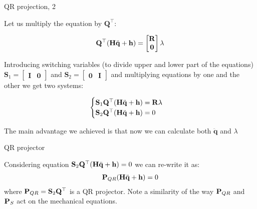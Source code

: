 \documentclass{beamer}
\begin{document}
\begin{frame}{QR projection, 2}
	\begin{flushleft}
		
		Let us multiply the equation by $\mathbf{Q}^\top$:
		
		\begin{equation}
			\mathbf{Q}^\top (\mathbf{H}\ddot{\mathbf{q}} + \mathbf{h}) = \begin{bmatrix} \mathbf{R} \\ \mathbf{0}  \end{bmatrix} \lambda
		\end{equation}
		
		Introducing switching variables (to divide upper and lower part of the equations) $\mathbf{S}_1 = \begin{bmatrix} \mathbf{I} & \mathbf{0}  \end{bmatrix}$ and $\mathbf{S}_2 = \begin{bmatrix} \mathbf{0} & \mathbf{I}  \end{bmatrix}$ and multiplying equations by one and the other we get two systems:
		
		\begin{equation}
			\begin{cases}
				\mathbf{S}_1 \mathbf{Q}^\top (\mathbf{H}\ddot{\mathbf{q}} + \mathbf{h}) =\mathbf{R} \lambda 
				\\
				\mathbf{S}_2 \mathbf{Q}^\top (\mathbf{H}\ddot{\mathbf{q}} + \mathbf{h}) = 0
			\end{cases}
		\end{equation}
		
		The main advantage we achieved is that now we can calculate both $\ddot{\mathbf{q}}$ and $\lambda$
		
	\end{flushleft}
\end{frame}


\begin{frame}{QR projector}
	\begin{flushleft}
		
		Considering equation $\mathbf{S}_2 \mathbf{Q}^\top (\mathbf{H}\ddot{\mathbf{q}} + \mathbf{h}) = 0$ we can re-write it as:
		\begin{align}
				\mathbf{P}_{QR} (\mathbf{H}\ddot{\mathbf{q}} + \mathbf{h}) = 0
		\end{align}
		where $\mathbf{P}_{QR} = \mathbf{S}_2 \mathbf{Q}^\top$ is a QR projector. Note a similarity of the way $\mathbf{P}_{QR}$ and $\mathbf{P}_S$ act on the mechanical equations.
		
	\end{flushleft}
\end{frame}
\end{document}
